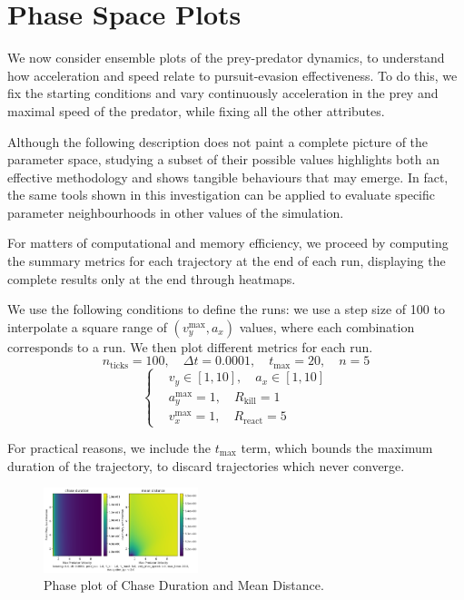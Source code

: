 \documentclass[11pt, twocolumn]{article}
\begin{document}
        \section{Phase Space Plots}
        We now consider ensemble plots of the prey-predator dynamics, to understand how acceleration and speed relate to pursuit-evasion effectiveness. To do this, we fix the starting conditions and vary continuously acceleration in the prey and maximal speed of the predator, while fixing all the other attributes.

        Although the following description does not paint a complete picture of the parameter space, studying a subset of their possible values highlights both an effective methodology and shows tangible behaviours that may emerge. In fact, the same tools shown in this investigation can be applied to evaluate specific parameter neighbourhoods in other values of the simulation.

        For matters of computational and memory efficiency, we proceed by computing the summary metrics for each trajectory at the end of each run, displaying the complete results only at the end through heatmaps.

        We use the following conditions to define the runs: we use a step size of 100 to interpolate a square range of $(v^\text{max}_y, a_x)$ values, where each combination corresponds to a run. We then plot different metrics for each run.
        \[
          n_{\text{ticks}} = 100, \quad \Delta t = 0.0001,\quad t_{\text{max}} = 20,\quad n = 5
        \]
        \[
          \left\{
            \begin{aligned}
              &v_y \in [1, 10],\quad a_x \in [1, 10] \\
              &a^{\text{max}}_y = 1,\quad R_{\text{kill}} = 1 \\
              &v^{\text{max}}_x = 1,\quad R_{\text{react}} = 5
            \end{aligned}
            \right.
          \]

          For practical reasons, we include the $t_{\text{max}}$ term, which bounds the maximum duration of the trajectory, to discard trajectories which never converge.

          \begin{figure}[H]
            \centering
            \includegraphics[width=0.4\textwidth]{figures/phase_duration_distance.png}
            \caption{Phase plot of Chase Duration and Mean Distance.}
            \label{fig:phaseplot1}
          \end{figure}
\end{document}
